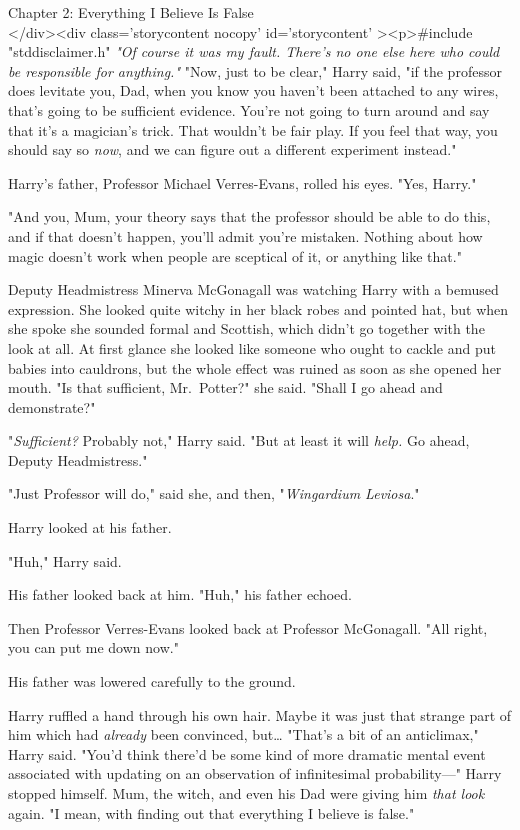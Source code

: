 
Chapter 2: Everything I Believe Is False\\
</div><div  class='storycontent nocopy' id='storycontent' ><p>#include 
"stddisclaimer.h"
\sbreak
\emph{"Of course it was my fault. There's no one else here who could be 
responsible for anything."}
\sbreak
"Now, just to be clear," Harry said, "if the professor does levitate you, Dad, 
when you know you haven't been attached to any wires, that's going to be 
sufficient evidence. You're not going to turn around and say that it's a 
magician's trick. That wouldn't be fair play. If you feel that way, you should 
say so \emph{now}, and we can figure out a different experiment instead."

Harry's father, Professor Michael Verres-Evans, rolled his eyes. "Yes, Harry."

"And you, Mum, your theory says that the professor should be able to do this, 
and if that doesn't happen, you'll admit you're mistaken. Nothing about how 
magic doesn't work when people are sceptical of it, or anything like that."

Deputy Headmistress Minerva McGonagall was watching Harry with a bemused 
expression. She looked quite witchy in her black robes and pointed hat, but 
when she spoke she sounded formal and Scottish, which didn't go together with 
the look at all. At first glance she looked like someone who ought to cackle 
and put babies into cauldrons, but the whole effect was ruined as soon as she 
opened her mouth. "Is that sufficient, Mr.~Potter?" she said. "Shall I go ahead 
and demonstrate?"

"\emph{Sufficient?} Probably not," Harry said. "But at least it will 
\emph{help.} Go ahead, Deputy Headmistress."

"Just Professor will do," said she, and then, "\emph{Wingardium Leviosa}."

Harry looked at his father.

"Huh," Harry said.

His father looked back at him. "Huh," his father echoed.

Then Professor Verres-Evans looked back at Professor McGonagall. "All right, 
you can put me down now."

His father was lowered carefully to the ground.

Harry ruffled a hand through his own hair. Maybe it was just that strange part 
of him which had \emph{already} been convinced, but{\ldots} "That's a bit of an 
anticlimax," Harry said. "You'd think there'd be some kind of more dramatic 
mental event associated with updating on an observation of infinitesimal 
probability---" Harry stopped himself. Mum, the witch, and even his Dad were 
giving him \emph{that look} again. "I mean, with finding out that everything I 
believe is false."

